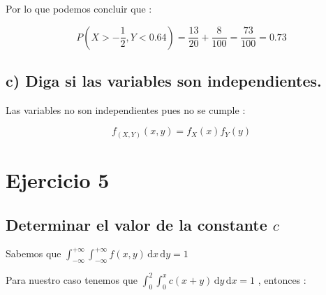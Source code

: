 \documentclass[12pt]{article}
\begin{document}
    \begin{flushleft}
        Por lo que podemos concluir que : 
    \end{flushleft}

    \begin{equation*}
        P\left(X> - \frac{1}{2} , Y < 0.64\right) = \frac{13}{20} + \frac{8}{100} = \frac{73}{100} = 0.73
    \end{equation*}


    \subsection*{c) Diga si las variables son independientes.}

    \begin{flushleft}
        Las variables no son independientes pues no se cumple : 
    \end{flushleft}

    \begin{equation*}
        f_{\left(X,Y\right)}\left(x,y\right) = f_X\left(x\right) f_Y\left(y\right) 
    \end{equation*}

    \vspace{2cm} 
    \section*{Ejercicio 5 }

    \subsection*{Determinar el valor de la constante $c$}

    \begin{flushleft}
        Sabemos que $ \displaystyle \int_{-\infty}^{+\infty} \int_{-\infty}^{+\infty} f\left(x,y\right) \,\mathrm{d}x  \,\mathrm{d}y   =1 $
    \end{flushleft}

    \begin{flushleft}
        Para nuestro caso tenemos que $\displaystyle \int_{0}^{2} \int_{0}^{x} c\left(x+y \right) \,\mathrm{d}y \,\mathrm{d}x   =1 $ , entonces : 
    \end{flushleft}
\end{document}
